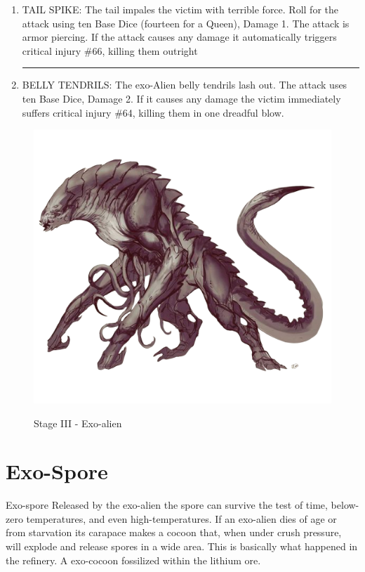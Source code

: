 \begin{rpg-commentbox}{}
\begin{small}
\begin{enumerate}
        \par\noindent\rule{.9\textwidth}{0.4pt}

        \item TAIL SPIKE: The tail impales the victim with terrible force. Roll for the attack using ten Base
        Dice (fourteen for a Queen), Damage 1. The attack is armor piercing. If the attack causes
        any damage it automatically triggers critical injury \#66, killing them outright

        \par\noindent\rule{.9\textwidth}{0.4pt}


        \item BELLY TENDRILS: The exo-Alien belly tendrils lash out. The attack uses
        ten Base Dice, Damage 2. If it causes any damage the victim immediately suffers critical
        injury \#64, killing them in one dreadful blow.
    \end{enumerate}
    \end{small}

\end{rpg-commentbox}


\begin{figure}
    \centering
    \includegraphics[width=.6\textwidth]{img/stage-III-bg.png}
    \label{fig:stage-3}
    \caption*{Stage III - Exo-alien}
\end{figure}


\section{Exo-Spore}

\begin{rpg-commentbox}{Exo-spore}
    Released by the exo-alien the spore can survive the test of time, below-zero temperatures, and even high-temperatures. If an exo-alien dies of age or from starvation its carapace makes a cocoon that, when under crush pressure, will explode and release spores in a wide area. This is basically what happened in the refinery. A exo-cocoon fossilized within the lithium ore.
\end{rpg-commentbox}